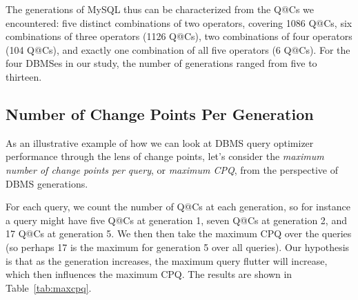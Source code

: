 \documentclass[prodmode,acmtods]{acmsmall}
\begin{document}
The generations of MySQL thus can be characterized from the Q@Cs we encountered: five distinct combinations of two
operators, covering 1086 Q@Cs, six combinations of three operators (1126 Q@Cs),
two combinations of four operators (104 Q@Cs), and exactly one
combination of all five operators (6 Q@Cs).
For the four \hbox{DBMSes} in our study, the number of generations ranged from five
to thirteen. 

\subsection{Number of Change Points Per Generation}\label{sec:CPQ}
As an illustrative example of how we can look at DBMS query optimizer
performance through the lens of change points, let's consider  the {\em
  maximum number of change points per query}, or {\em maximum CPQ}, from the
perspective of
\hbox{DBMS} generations.

For each query, we count the number of Q@Cs at each
generation, so for instance a query might have five Q@Cs at generation 1, seven Q@Cs at
generation 2, and 17 Q@Cs at generation 5. We then then take the maximum CPQ
over the queries (so perhaps 17 is the maximum for generation 5 over all
queries). Our hypothesis is that as the generation increases, the maximum
query flutter will increase, which then influences the maximum CPQ. The results are shown in Table~\ref{tab:maxcpq}.
\end{document}
